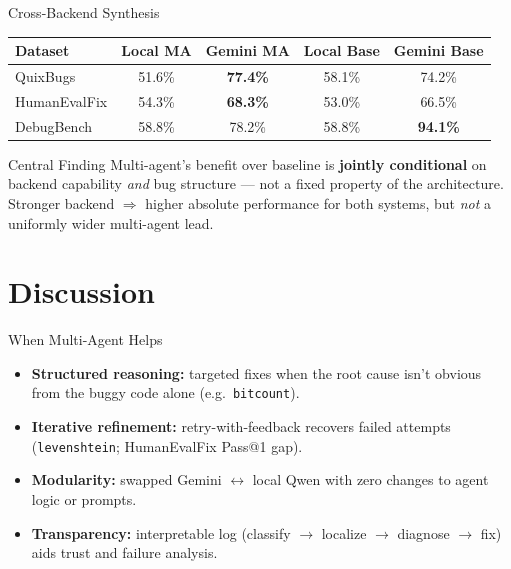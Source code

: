 \documentclass[aspectratio=169]{beamer}
\begin{document}
\begin{frame}{Cross-Backend Synthesis}
\begin{table}
\centering
\small
\begin{tabular}{lcccc}
\toprule
\textbf{Dataset} & \textbf{Local MA} & \textbf{Gemini MA} & \textbf{Local Base} & \textbf{Gemini Base} \\
\midrule
QuixBugs & 51.6\% & \textbf{77.4\%} & 58.1\% & 74.2\% \\
HumanEvalFix & 54.3\% & \textbf{68.3\%} & 53.0\% & 66.5\% \\
DebugBench & 58.8\% & 78.2\% & 58.8\% & \textbf{94.1\%} \\
\bottomrule
\end{tabular}
\end{table}
\begin{block}{Central Finding}
Multi-agent's benefit over baseline is \textbf{jointly conditional} on backend capability \emph{and} bug structure --- not a fixed property of the architecture. Stronger backend $\Rightarrow$ higher absolute performance for both systems, but \emph{not} a uniformly wider multi-agent lead.
\end{block}
\end{frame}

\section{Discussion}

\begin{frame}{When Multi-Agent Helps}
\begin{itemize}
    \item \textbf{Structured reasoning:} targeted fixes when the root cause isn't obvious from the buggy code alone (e.g.\ \texttt{bitcount}).
    \item \textbf{Iterative refinement:} retry-with-feedback recovers failed attempts (\texttt{levenshtein}; HumanEvalFix Pass@1 gap).
    \item \textbf{Modularity:} swapped Gemini $\leftrightarrow$ local Qwen with zero changes to agent logic or prompts.
    \item \textbf{Transparency:} interpretable log (classify $\to$ localize $\to$ diagnose $\to$ fix) aids trust and failure analysis.
\end{itemize}
\end{frame}
\end{document}

